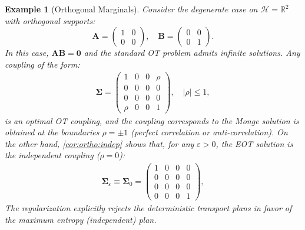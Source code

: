 \documentclass[noinfoline]{imsart}\setcounter{tocdepth}{2}
\renewcommand{\b}[1]{\mathbb{#1}}
\newcommand{\m}[1]{\mathbf{#1}}
\renewcommand{\c}[1]{\mathcal{#1}}
\theoremstyle{plain}
\newtheorem{example}{Example}[section]
\begin{document}
\begin{example}[Orthogonal Marginals]
Consider the degenerate case on $\c{H} = \b{R}^{2}$ with orthogonal supports:
\begin{equation*}
    \m{A} = \begin{pmatrix}
    1 & 0 \\
    0 & 0
    \end{pmatrix}, \quad \m{B} = \begin{pmatrix}
    0 & 0 \\
    0 & 1
    \end{pmatrix}.
\end{equation*}
In this case, $\m{A} \m{B} = \m{0}$ and the standard OT problem admits infinite solutions. Any coupling of the form:
\begin{align*}
    \m{\Sigma} = \left(
    \begin{array}{cc|cc}
        1 & 0 & 0 & \rho \\
        0 & 0 & 0 & 0 \\
        \hline
        0 & 0 & 0 & 0 \\
        \rho & 0 & 0 & 1
    \end{array}
    \right), \quad |\rho| \le 1,
\end{align*}
is an optimal OT coupling, and the coupling corresponds to the Monge solution is obtained at the boundaries $\rho = \pm 1$ (perfect correlation or anti-correlation). On the other hand, \cref{cor:ortho:indep} shows that, for any $\varepsilon > 0$, the EOT solution is the independent coupling ($\rho = 0$):
\begin{align*}
    \m{\Sigma}_{\varepsilon} \equiv \m{\Sigma}_{0} = \left(
    \begin{array}{cc|cc}
        1 & 0 & 0 & 0 \\
        0 & 0 & 0 & 0 \\
        \hline
        0 & 0 & 0 & 0 \\
        0 & 0 & 0 & 1
    \end{array}
    \right),
\end{align*}
The regularization explicitly rejects the deterministic transport plans in favor of the maximum entropy (independent) plan.
\end{example}
\end{document}
